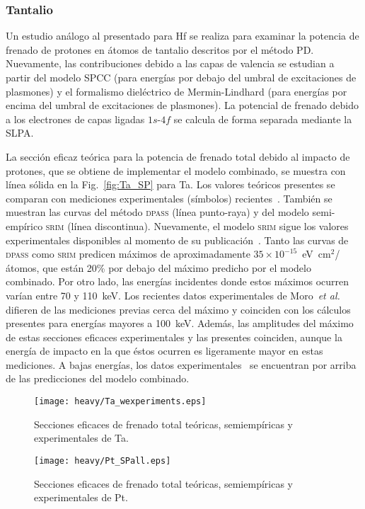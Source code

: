 \subsubsection{Tantalio}

Un estudio análogo al presentado para Hf se realiza para examinar la 
potencia de frenado de protones en átomos de tantalio descritos por el 
método PD. Nuevamente, las contribuciones debido a las capas de valencia 
se estudian a partir del modelo SPCC (para energías por debajo del 
umbral de excitaciones de plasmones) y el formalismo dieléctrico de 
Mermin-Lindhard (para energías por encima del umbral de excitaciones de 
plasmones). La potencial de frenado debido a los electrones de capas 
ligadas $1s$-$4f$ se calcula de forma separada mediante la SLPA.

La sección eficaz teórica para la potencia de frenado total debido al 
impacto de protones, que se obtiene de implementar el modelo combinado, 
se muestra con línea sólida en la Fig.~\ref{fig:Ta_SP} para Ta. Los 
valores teóricos presentes se comparan con mediciones experimentales 
(símbolos) recientes~\cite{Moro:20,Roth:17,iaea,Shiomi:96,Shiomi:94,
Bichsel:92,Ogino:88,Sirotinin:84,Krist:83}. También se muestran las 
curvas del método \textsc{dpass} (línea punto-raya) y del modelo 
semi-empírico \textsc{srim} (línea discontinua). Nuevamente, el modelo 
\textsc{srim} sigue los valores experimentales disponibles al momento de 
su publicación~\cite{iaea}. Tanto las curvas de \textsc{dpass} como 
\textsc{srim} predicen máximos de aproximadamente 
$35\times 10^{-15}$~eV~cm$^2$/átomos, que están 20\% por debajo del 
máximo predicho por el modelo combinado. Por otro lado, las energías 
incidentes donde estos máximos ocurren varían entre 70 y 110~keV. Los 
recientes datos experimentales de Moro~\textit{et al.}~\cite{Moro:20} 
difieren de las mediciones previas cerca del máximo y coinciden con los 
cálculos presentes para energías mayores a 100~keV. Además, las 
amplitudes del máximo de estas secciones eficaces experimentales y las 
presentes coinciden, aunque la energía de impacto en la que éstos 
ocurren es ligeramente mayor en estas mediciones. A bajas energías, los 
datos experimentales~\cite{Roth:17} se encuentran por arriba de las 
predicciones del modelo combinado. 

\begin{figure}%
\centering
\vspace{-0.7cm}
\texttt{[image: heavy/Ta\_wexperiments.eps]}
\caption[Secciones eficaces teóricas, semiempíricas y experimentales de 
Ta.]
{Secciones eficaces de frenado total teóricas, semiempíricas y
experimentales de Ta.}
\label{fig:Ta_SP}

\vspace{0.3cm}
\texttt{[image: heavy/Pt\_SPall.eps]}
\caption[Secciones eficaces teóricas, semiempíricas y experimentales de 
Pt.]
{Secciones eficaces de frenado total teóricas, semiempíricas y
experimentales de Pt.}
\label{fig:Pt_SP}
\end{figure}

